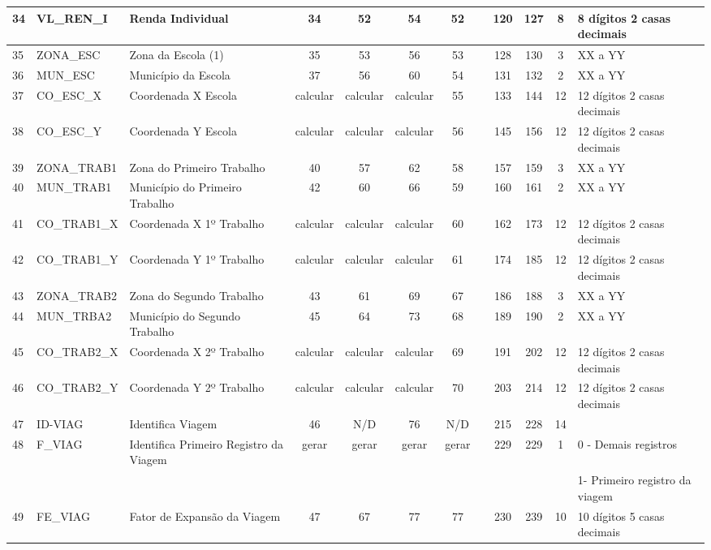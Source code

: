 \begin{table}[htbp]
\begin{center}
\begin{tabular}{|p{1cm}|l|l|c|c|c|c|c|c|c|c|l|}
34 & VL\_REN\_I & Renda Individual & 34 & 52 & 54 & 52 &  & 120 & 127 & 8 & 8 dígitos 2 casas decimais \\ \hline
35 & ZONA\_ESC & Zona da Escola (1) & 35 & 53 & 56 & 53 &  & 128 & 130 & 3 & XX a YY \\ \hline
36 & MUN\_ESC & Município da Escola & 37 & 56 & 60 & 54 &  & 131 & 132 & 2 & XX a YY \\ \hline
37 & CO\_ESC\_X & Coordenada X Escola & calcular & calcular & calcular & 55 &  & 133 & 144 & 12 & 12 dígitos 2 casas decimais \\ \hline
38 & CO\_ESC\_Y & Coordenada Y Escola & calcular & calcular & calcular & 56 &  & 145 & 156 & 12 & 12 dígitos 2 casas decimais \\ \hline
39 & ZONA\_TRAB1 & Zona do Primeiro Trabalho & 40 & 57 & 62 & 58 &  & 157 & 159 & 3 & XX a YY \\ \hline
40 & MUN\_TRAB1 & Município do Primeiro Trabalho & 42 & 60 & 66 & 59 &  & 160 & 161 & 2 & XX a YY \\ \hline
41 & CO\_TRAB1\_X & Coordenada X 1º Trabalho & calcular & calcular & calcular & 60 &  & 162 & 173 & 12 & 12 dígitos 2 casas decimais \\ \hline
42 & CO\_TRAB1\_Y & Coordenada Y 1º Trabalho & calcular & calcular & calcular & 61 &  & 174 & 185 & 12 & 12 dígitos 2 casas decimais \\ \hline
43 & ZONA\_TRAB2 & Zona do Segundo Trabalho & 43 & 61 & 69 & 67 &  & 186 & 188 & 3 & XX a YY \\ \hline
44 & MUN\_TRBA2 & Município do Segundo Trabalho & 45 & 64 & 73 & 68 &  & 189 & 190 & 2 & XX a YY \\ \hline
45 & CO\_TRAB2\_X & Coordenada X 2º Trabalho & calcular & calcular & calcular & 69 &  & 191 & 202 & 12 & 12 dígitos 2 casas decimais \\ \hline
46 & CO\_TRAB2\_Y & Coordenada Y 2º Trabalho & calcular & calcular & calcular & 70 &  & 203 & 214 & 12 & 12 dígitos 2 casas decimais \\ \hline
47 & ID-VIAG & Identifica Viagem & 46 & N/D & 76 & N/D &  & 215 & 228 & 14 &  \\ \hline
48 & F\_VIAG & Identifica Primeiro Registro da Viagem & gerar & gerar & gerar & gerar &  & 229 & 229 & 1 & 0 - Demais registros \\ \hline
 &  &  &  &  &  &  &  &  &  &  & 1- Primeiro registro da viagem \\ \hline
49 & FE\_VIAG & Fator de Expansão da Viagem & 47 & 67 & 77 & 77 &  & 230 & 239 & 10 & 10 dígitos 5 casas decimais \\ \hline

\end{tabular}
\end{center}
\end{table}
